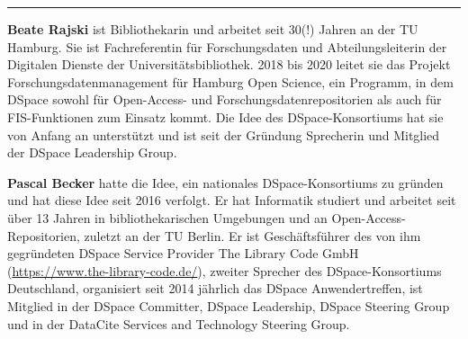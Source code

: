 \begin{center}\rule{0.5\linewidth}{\linethickness}\end{center}

\textbf{Beate Rajski} ist Bibliothekarin und arbeitet seit 30(!) Jahren
an der TU Hamburg. Sie ist Fachreferentin für Forschungsdaten und
Abteilungsleiterin der Digitalen Dienste der Universitätsbibliothek.
2018 bis 2020 leitet sie das Projekt Forschungsdatenmanagement für
Hamburg Open Science, ein Programm, in dem DSpace sowohl für
Open-Access- und Forschungsdatenrepositorien als auch für FIS-Funktionen
zum Einsatz kommt. Die Idee des DSpace-Konsortiums hat sie von Anfang an
unterstützt und ist seit der Gründung Sprecherin und Mitglied der DSpace
Leadership Group.

\textbf{Pascal Becker} hatte die Idee, ein nationales DSpace-Konsortiums
zu gründen und hat diese Idee seit 2016 verfolgt. Er hat Informatik
studiert und arbeitet seit über 13 Jahren in bibliothekarischen
Umgebungen und an Open-Access-Repositorien, zuletzt an der TU Berlin. Er
ist Geschäftsführer des von ihm gegründeten DSpace Service Provider The
Library Code GmbH (\url{https://www.the-library-code.de/}), zweiter
Sprecher des DSpace-Konsortiums Deutschland, organisiert seit 2014
jährlich das DSpace Anwendertreffen, ist Mitglied in der DSpace
Committer, DSpace Leadership, DSpace Steering Group und in der DataCite
Services and Technology Steering Group.
